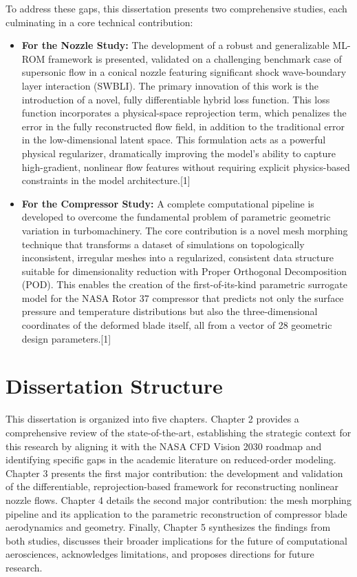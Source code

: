\documentclass[12pt, a4paper]{report}
\begin{document}
To address these gaps, this dissertation presents two comprehensive studies, each culminating in a core technical contribution:

\begin{itemize}
    \item \textbf{For the Nozzle Study:} The development of a robust and generalizable ML-ROM framework is presented, validated on a challenging benchmark case of supersonic flow in a conical nozzle featuring significant shock wave-boundary layer interaction (SWBLI). The primary innovation of this work is the introduction of a novel, fully differentiable hybrid loss function. This loss function incorporates a physical-space reprojection term, which penalizes the error in the fully reconstructed flow field, in addition to the traditional error in the low-dimensional latent space. This formulation acts as a powerful physical regularizer, dramatically improving the model's ability to capture high-gradient, nonlinear flow features without requiring explicit physics-based constraints in the model architecture.[1]
    \item \textbf{For the Compressor Study:} A complete computational pipeline is developed to overcome the fundamental problem of parametric geometric variation in turbomachinery. The core contribution is a novel mesh morphing technique that transforms a dataset of simulations on topologically inconsistent, irregular meshes into a regularized, consistent data structure suitable for dimensionality reduction with Proper Orthogonal Decomposition (POD). This enables the creation of the first-of-its-kind parametric surrogate model for the NASA Rotor 37 compressor that predicts not only the surface pressure and temperature distributions but also the three-dimensional coordinates of the deformed blade itself, all from a vector of 28 geometric design parameters.[1]
\end{itemize}

\section{Dissertation Structure}

This dissertation is organized into five chapters. Chapter 2 provides a comprehensive review of the state-of-the-art, establishing the strategic context for this research by aligning it with the NASA CFD Vision 2030 roadmap and identifying specific gaps in the academic literature on reduced-order modeling. Chapter 3 presents the first major contribution: the development and validation of the differentiable, reprojection-based framework for reconstructing nonlinear nozzle flows. Chapter 4 details the second major contribution: the mesh morphing pipeline and its application to the parametric reconstruction of compressor blade aerodynamics and geometry. Finally, Chapter 5 synthesizes the findings from both studies, discusses their broader implications for the future of computational aerosciences, acknowledges limitations, and proposes directions for future research.
\end{document}
